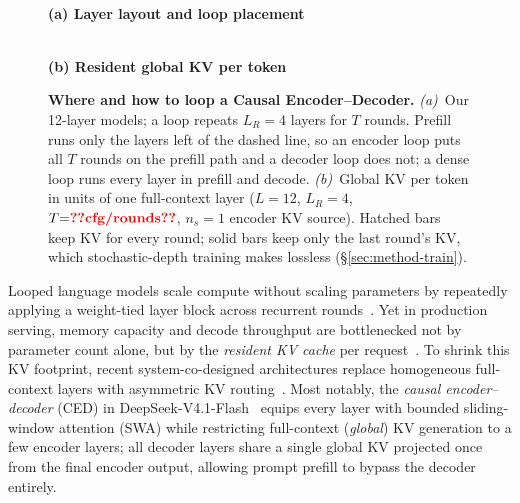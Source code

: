 \begin{figure}[t]
\begin{minipage}[b]{0.58\textwidth}
\\[3pt]{\small\textbf{(a) Layer layout and loop placement}}
\end{minipage}\hfill
\begin{minipage}[b]{0.40\textwidth}
\centering
{}
\\[3pt]{\small\textbf{(b) Resident global KV per token}}
\end{minipage}
\caption{\textbf{Where and how to loop a Causal Encoder--Decoder.}
\emph{(a)}~Our 12-layer models; a loop repeats $L_R{=}4$ layers for $T$ rounds. Prefill runs only the layers left of the dashed line, so an encoder loop puts all $T$ rounds on the prefill path and a decoder loop does not; a dense loop runs every layer in prefill and decode.
\emph{(b)}~Global KV per token in units of one full-context layer ($L{=}12$, $L_R{=}4$, $T{=}\val{cfg/rounds}$, $n_s{=}1$ encoder KV source). Hatched bars keep KV for every round; solid bars keep only the last round's KV, which stochastic-depth training makes lossless (\S\ref{sec:method-train}).}
\label{fig:main}
\end{figure}

Looped language models scale compute without scaling parameters by repeatedly applying a weight-tied layer block across recurrent rounds~\citep{universal_transformer,saunshi_looped,parcae,huginn,ouro}. Yet in production serving, memory capacity and decode throughput are bottlenecked not by parameter count alone, but by the \emph{resident KV cache} per request~\citep{vllm,gtagla}. To shrink this KV footprint, recent system-co-designed architectures replace homogeneous full-context layers with asymmetric KV routing~\citep{cla,yoco,deepseekv41}. Most notably, the \emph{causal encoder--decoder} (CED) in DeepSeek-V4.1-Flash~\citep{deepseekv41} equips every layer with bounded sliding-window attention (SWA) while restricting full-context (\emph{global}) KV generation to a few encoder layers; all decoder layers share a single global KV projected once from the final encoder output, allowing prompt prefill to bypass the decoder entirely.

